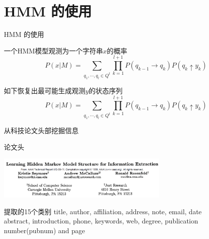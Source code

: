 \documentclass{beamer}
\begin{document}
\section{HMM 的使用}
\begin{frame}{HMM 的使用}
    \begin{block}{ 一个HMM模型观测为一个字符串$x$的概率}
    \begin{equation}
    P(x|M) = \sum_{q_1,\cdots,q_l \in Q^t} {
        \prod_{k=1}^{l+1}{
            P(q_{k-1} \rightarrow q_k) P(q_k \uparrow y_k)
        }
    }
    \end{equation}
    \end{block}

    \pause
    \begin{block}{ 如下恢复出最可能生成观测$y$的状态序列}
    \begin{equation}
    P(x|M) = \sum_{q_1,\cdots,q_l \in Q^t} {
        \prod_{k=1}^{l+1}{
            P(q_{k-1} \rightarrow q_k) P(q_k \uparrow y_k)
        }
    }
    \end{equation}
    \end{block}
\end{frame}

\begin{frame}{ 从科技论文头部挖掘信息}
    \begin{block}{论文头}
    \begin{center}
        \includegraphics[width=240pt]{report5/report_header.png}
    \end{center}
    \end{block}
\pause
    \begin{block}{提取的15个类别}
        title, author, affiliation, address, note, email, date\\
        abstract, introduction, phone, keywords, web, degree, publication number(pubnum) and page
         
    \end{block}
\end{frame}
\end{document}
